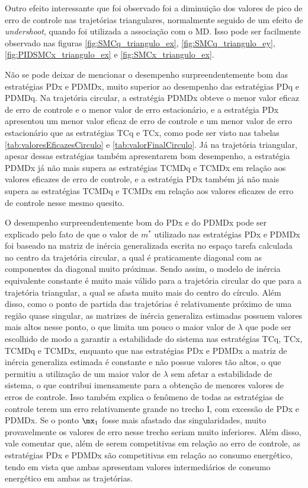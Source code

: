 \documentclass[]{politex}
\begin{document}
Outro efeito interessante que foi observado foi a diminuição dos valores de pico de erro de controle nas trajetórias triangulares, normalmente seguido de um efeito de \emph{undershoot}, quando foi utilizada a associação com o MD. Isso pode ser facilmente observado nas figuras \ref{fig:SMCq_triangulo_ex}, \ref{fig:SMCq_triangulo_ey}, \ref{fig:PIDSMCx_triangulo_ex} e \ref{fig:SMCx_triangulo_ex}.

Não se pode deixar de mencionar o desempenho surpreendentemente bom das estratégias PDx e PDMDx, muito superior ao desempenho das estratégias PDq e PDMDq. Na trajetória circular, a estratégia PDMDx obteve o menor valor eficaz de erro de controle e o menor valor de erro estacionário, e a estratégia PDx apresentou um menor valor eficaz de erro de controle e um menor valor de erro estacionário que as estratégias TCq e TCx, como pode ser visto nas tabelas \ref{tab:valoresEficazesCirculo} e \ref{tab:valorFinalCirculo}. Já na trajetória triangular, apesar dessas estratégias também apresentarem bom desempenho, a estratégia PDMDx já não mais supera as estratégias TCMDq e TCMDx em relação aos valores eficazes de erro de controle, e a estratégia PDx também já não mais supera as estratégias TCMDq e TCMDx em relação aos valores eficazes de erro de controle nesse mesmo quesito.

O desempenho surpreendentemente bom do PDx e do PDMDx pode ser explicado pelo fato de que o valor de $m^*$ utilizado nas estratégias PDx e PDMDx foi baseado na matriz de inércia generalizada escrita no espaço tarefa calculada no centro da trajetória circular, a qual é praticamente diagonal com as componentes da diagonal muito próximas. Sendo assim, o modelo de inércia equivalente constante é muito mais válido para a trajetória circular do que para a trajetória triangular, a qual se afasta muito mais do centro do círculo. Além disso, como o ponto de partida das trajetórias é relativamente próximo de uma região quase singular, as matrizes de inércia generaliza estimadas possuem valores mais altos nesse ponto, o que limita um pouco o maior valor de $\lambda$ que pode ser escolhido de modo a garantir a estabilidade do sistema nas estratégias TCq, TCx, TCMDq e TCMDx, enquanto que nas estratégias PDx e PDMDx a matriz de inércia generaliza estimada é constante e não possue valores tão altos, o que permitiu a utilização de um maior valor de $\lambda$ sem afetar a estabilidade de sistema, o que contribui imensamente para a obtenção de menores valores de erros de controle. Isso também explica o fenômeno de todas as estratégias de controle terem um erro relativamente grande no trecho I, com excessão de PDx e PDMDx. Se o ponto $\mx_1$ fosse mais afastado das singularidades, muito provavelmente os valores de erro nesse trecho seriam muito inferiores. Além disso, vale comentar que, além de serem competitivas em relação ao erro de controle, as estratégias PDx e PDMDx são competitivas em relação ao consumo energético, tendo em vista que ambas apresentam valores intermediários de consumo energético em ambas as trajetórias.
\end{document}
